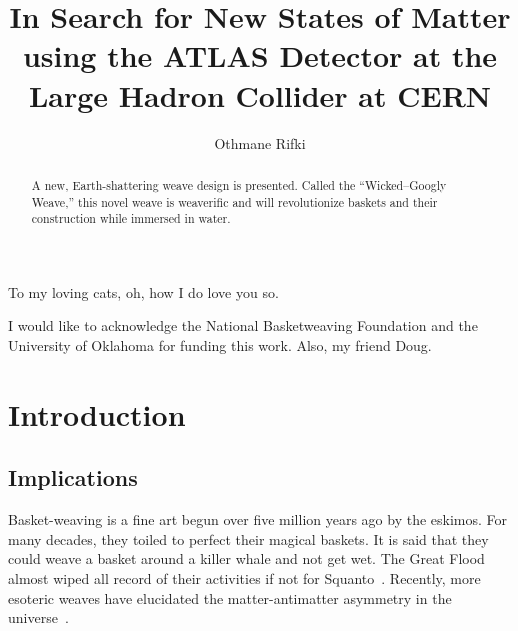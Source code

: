 \documentclass{outhesis}
\begin{document}
\author{Othmane Rifki}

\title{In Search for New States of Matter using the ATLAS Detector at the Large Hadron Collider at CERN}

\address{Norman, Oklahoma}

\begin{dedication}
  To my loving cats, oh, how I do love you so.
\end{dedication}

\begin{acknowledgements}
  I would like to acknowledge the National Basketweaving Foundation and the University of Oklahoma for funding this work. Also, my friend Doug.
\end{acknowledgements}


\begin{abstract}
A new, Earth-shattering weave design is presented.
Called the ``Wicked--Googly Weave,'' this novel weave is weaverific and will revolutionize baskets and their construction while immersed in water.
\end{abstract}


\frontmatter

\maketitle

\mainmatter

\chapter{Introduction}

\section{Implications}

Basket-weaving is a fine art begun over five million years ago by the eskimos.
For many decades, they toiled to perfect their magical baskets.
It is said that they could weave a basket around a killer whale and not get wet.
The Great Flood almost wiped all record of their activities if not for Squanto~\cite{Doug}.
Recently, more esoteric weaves have elucidated the matter-antimatter asymmetry in the universe~\cite{Lee+1957}.
\end{document}
